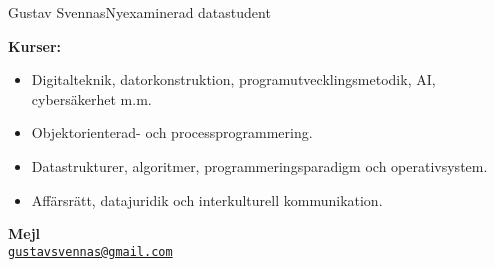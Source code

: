 \documentclass{article}
\begin{document}
\begin{cv}[avatar]{Gustav Svennas}{Nyexaminerad datastudent}

\begin{cvevent}[2018][2023]
    \textbf{Kurser:}
    \begin{itemize}
        \item Digitalteknik, datorkonstruktion, programutvecklingsmetodik, AI, cybersäkerhet m.m.
        \item Objektorienterad- och processprogrammering. 
        \item Datastrukturer, algoritmer, programmeringsparadigm och operativsystem.
        \item Affärsrätt, datajuridik och interkulturell kommunikation.
    \end{itemize}
\end{cvevent}

\begin{cvevent}[2012][2015]
\end{cvevent}


\begin{cvevent}[2017][2020]
\end{cvevent}

\begin{cvevent}[2009][2014]
\end{cvevent}


\cvsidebar %



\begin{cvitem}[Envelope][4]
    \textbf{Mejl}\\
    \href{mailto:gustavsvennas@gmail.com}{\texttt{gustavsvennas@gmail.com}}
\end{cvitem}


\end{cv}
\end{document}
